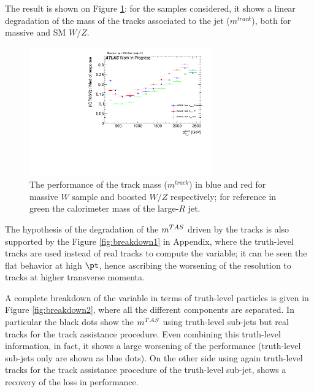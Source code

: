 The result is shown on Figure \ref{fig:trackdegrade}: for the samples considered, it shows a linear degradation of the mass of the tracks associated to the jet ($m^{track}$), both for massive and SM $W/Z$.

\begin{figure}[!ht]
  \centering
      \includegraphics[width=0.7\textwidth]{jet_part/calib/71graphcftr_h_JetRatio_mJ12CALOIQRoMcalib_trkmass.pdf}
  \caption[Track mass degradation in tops and massive $W/Z$]{The performance of the track mass ($m^{track}$) in blue and red for massive $W$ sample and boosted $W/Z$ respectively; for reference in green the calorimeter mass of the large-$R$ jet.}
  \label{fig:trackdegrade}
\end{figure}
The hypothesis of the degradation of the $m^{TAS}$ driven by the tracks is also supported by the Figure \ref{fig:breakdown1} in Appendix, where the truth-level tracks are used instead of real tracks to compute the variable; it can be seen the flat behavior at high $\pt$, hence ascribing the worsening of the resolution to tracks at higher transverse momenta.

A complete breakdown of the variable in terms of truth-level particles is given in Figure \ref{fig:breakdown2}, where all the different components are separated.
In particular the black dots show the $m^{TAS}$ using truth-level sub-jets but real tracks for the track assistance procedure.
Even combining this truth-level information, in fact, it shows a large worsening of the performance (truth-level sub-jets only are shown as blue dots).
On the other side using again truth-level tracks for the track assistance procedure of the truth-level sub-jet, shows a recovery of the loss in performance.


